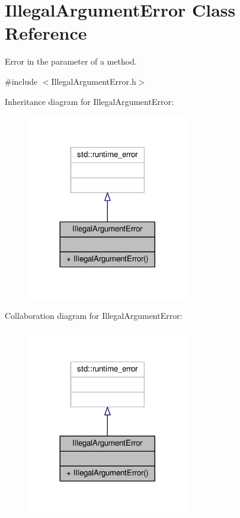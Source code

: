 \hypertarget{classIllegalArgumentError}{}\section{Illegal\+Argument\+Error Class Reference}
\label{classIllegalArgumentError}


Error in the parameter of a method.  




{\ttfamily \#include $<$Illegal\+Argument\+Error.\+h$>$}



Inheritance diagram for Illegal\+Argument\+Error\+:\nopagebreak
\begin{figure}[H]
\begin{center}
\leavevmode
\includegraphics[width=200pt]{classIllegalArgumentError__inherit__graph}
\end{center}
\end{figure}


Collaboration diagram for Illegal\+Argument\+Error\+:\nopagebreak
\begin{figure}[H]
\begin{center}
\leavevmode
\includegraphics[width=200pt]{classIllegalArgumentError__coll__graph}
\end{center}
\end{figure}
